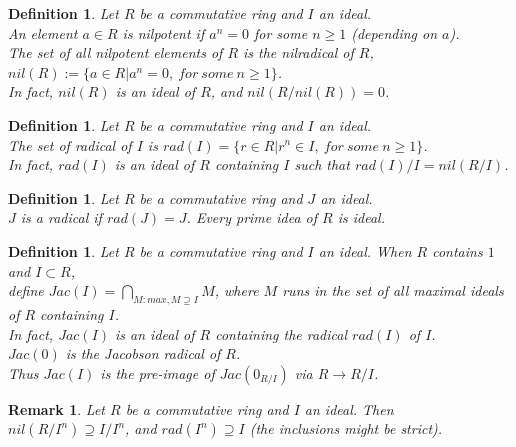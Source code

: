 \documentclass[a4paper,8pt]{article}
\theoremstyle{theorem}
\newtheorem{definition}[theorem]{Definition}
\newtheorem{remark}[theorem]{Remark}
\begin{document}
\begin{definition}
Let $R$ be a commutative ring and $I$ an ideal.\\
An element $a \in R$ is 	\textit{{\color{blue} nilpotent}} if $a^n = 0$ for some $n \geq 1$ (depending on $a$).\\
The set of all nilpotent elements of $R$ is the 	\textit{{\color{blue} nilradical of $R$}}, $nil(R) := \{a \in R | a^n = 0, \ for \ some \ n \geq 1 \}$.\\
In fact, $nil(R)$ is an ideal of $R$, and $nil(R/nil(R)) = 0$.\\
\end{definition}


\begin{definition}
Let $R$ be a commutative ring and $I$ an ideal.\\
The set of \textit{{\color{blue} radical of $I$}} is $rad(I) = \{ r \in R | r^n \in I, \ for \ some \ n \geq 1\}$.\\
In fact, $rad(I)$ is an ideal of $R$ containing $I$ such that $rad(I)/I = nil(R/I)$.\\
\end{definition}


\begin{definition}
Let $R$ be a commutative ring and $J$ an ideal.\\
$J$ is a radical if $rad(J) = J$. Every prime idea of $R$ is ideal.\\
\end{definition}


\begin{definition}
Let $R$ be a commutative ring and $I$ an ideal.
When $R$ contains $1$ and $I \subset R$, \\
define $Jac(I) = \bigcap_{M: max, M \supseteq I} M$, where $M$ runs in the set of all maximal ideals of $R$ containing $I$.\\
In fact, $Jac(I)$ is an ideal of $R$ containing the radical $rad(I)$ of $I$.\\
$Jac(0)$ is the \textit{{\color{blue} Jacobson radical of $R$}}.\\
Thus $Jac(I)$ is the pre-image of $Jac(0_{R/I})$ via $R \rightarrow R/I$.\\
\end{definition}


\begin{remark}
Let $R$ be a commutative ring and $I$ an ideal. Then $nil(R/I^n) \supseteq I/I^n$, and $rad(I^n) \supseteq I$ (the inclusions might be strict).
\end{remark}
\end{document}

